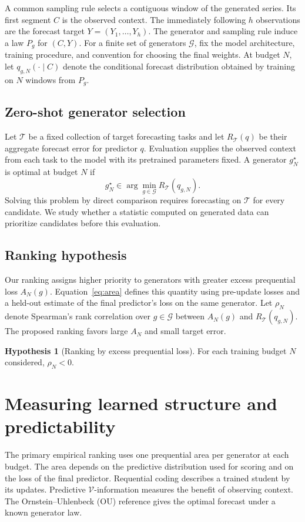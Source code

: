 \documentclass[10pt,a4paper]{article}
\theoremstyle{definition}
\newtheorem{hypothesis}{Hypothesis}
\begin{document}
A common sampling rule selects a contiguous window of the generated series.
Its first segment $C$ is the observed context. The immediately following
$h$ observations are the forecast target $Y=(Y_1,\ldots,Y_h)$. The generator
and sampling rule induce a law $P_g$ for $(C,Y)$. For a finite set of
generators $\mathcal G$, fix the model architecture, training procedure,
and convention for choosing the final weights. At budget $N$, let
$q_{g,N}(\cdot\mid C)$ denote the conditional forecast distribution
obtained by training on $N$ windows from $P_g$.

\subsection{Zero-shot generator selection}
Let $\mathcal T$ be a fixed collection of target forecasting tasks and let
$R_{\mathcal T}(q)$ be their aggregate forecast error for predictor $q$.
Evaluation supplies the observed context from each task to the model with
its pretrained parameters fixed. A generator $g_N^\star$ is optimal at
budget $N$ if
\begin{equation}
 g_N^\star\in\arg\min_{g\in\mathcal G}R_{\mathcal T}(q_{g,N}).
 \label{eq:generator-selection}
\end{equation}
Solving this problem by direct comparison requires forecasting on
$\mathcal T$ for every candidate. We study whether a statistic computed on
generated data can prioritize candidates before this evaluation.

\subsection{Ranking hypothesis}
Our ranking assigns higher priority to generators with greater excess
prequential loss $A_N(g)$. Equation~\eqref{eq:area} defines this quantity
using pre-update losses and a held-out estimate of the final predictor's
loss on the same generator. Let $\rho_N$ denote Spearman's rank correlation
over $g\in\mathcal G$ between $A_N(g)$ and $R_{\mathcal T}(q_{g,N})$.
The proposed ranking favors large $A_N$ and small target error.

\begin{hypothesis}[Ranking by excess prequential loss]\label{hyp:prequential-ranking}
For each training budget $N$ considered, $\rho_N<0$.
\end{hypothesis}

\section{Measuring learned structure and predictability}\label{sec:measurements}
The primary empirical ranking uses one prequential area per generator at
each budget. The area depends on the predictive distribution used for scoring
and on the loss of the final predictor. Requential coding describes a
trained student by its updates. Predictive $\mathcal V$-information
measures the benefit of observing context. The Ornstein--Uhlenbeck (OU)
reference gives the optimal forecast under a known generator law.
\end{document}
